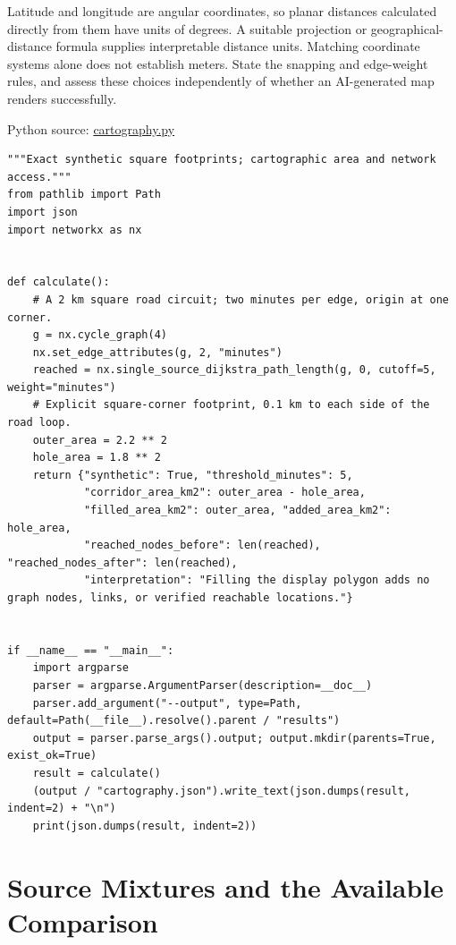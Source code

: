 Latitude and longitude are angular coordinates, so planar distances
calculated directly from them have units of degrees. A suitable
projection or geographical-distance formula supplies interpretable
distance units. Matching coordinate systems alone does not establish
meters. State the snapping and edge-weight rules, and assess these
choices independently of whether an AI-generated map renders
successfully.

\FloatBarrier
{}
Python source:
\href{../03_Data_and_Code/Retail_Accessibility/cartography.py}{cartography.py}

\begin{Verbatim}[breaklines,breakanywhere,fontsize=\small]
"""Exact synthetic square footprints; cartographic area and network access."""
from pathlib import Path
import json
import networkx as nx


def calculate():
    # A 2 km square road circuit; two minutes per edge, origin at one corner.
    g = nx.cycle_graph(4)
    nx.set_edge_attributes(g, 2, "minutes")
    reached = nx.single_source_dijkstra_path_length(g, 0, cutoff=5, weight="minutes")
    # Explicit square-corner footprint, 0.1 km to each side of the road loop.
    outer_area = 2.2 ** 2
    hole_area = 1.8 ** 2
    return {"synthetic": True, "threshold_minutes": 5,
            "corridor_area_km2": outer_area - hole_area,
            "filled_area_km2": outer_area, "added_area_km2": hole_area,
            "reached_nodes_before": len(reached), "reached_nodes_after": len(reached),
            "interpretation": "Filling the display polygon adds no graph nodes, links, or verified reachable locations."}


if __name__ == "__main__":
    import argparse
    parser = argparse.ArgumentParser(description=__doc__)
    parser.add_argument("--output", type=Path, default=Path(__file__).resolve().parent / "results")
    output = parser.parse_args().output; output.mkdir(parents=True, exist_ok=True)
    result = calculate()
    (output / "cartography.json").write_text(json.dumps(result, indent=2) + "\n")
    print(json.dumps(result, indent=2))
\end{Verbatim}

\hypertarget{M02-source-mixtures-and-the-available-comparison}{%
\section{Source Mixtures and the Available
Comparison}\label{M02-source-mixtures-and-the-available-comparison}}

